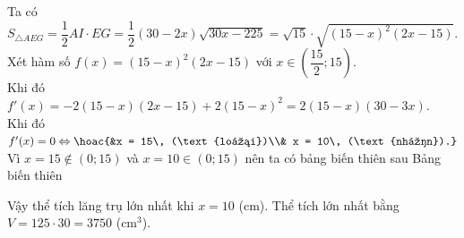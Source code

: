 \begin{ex}
{\begin{itemchoice}
			 \itemch
			Ta có $S_{\triangle AEG} = \dfrac{1}{2}AI \cdot EG = \dfrac{1}{2}(30 - 2x) \sqrt{30x - 225} = \sqrt{15} \cdot \sqrt{(15  - x)^2 (2x - 15)}.$
			\itemch 
			Xét hàm số $f(x) = (15 - x)^2(2x - 15)$  với $x \in \left(\dfrac{15}{2}; 15\right)$.\\
			Khi đó $f'(x) = -2(15 - x)(2x - 15) +  2(15 - x)^2 = 2(15 - x)(30 - 3x)$.\\
			Khi  đó $f'(x) = 0 \Leftrightarrow \hoac{&x = 15\, (\text{loại})\\& x = 10\, (\text{nhận}).}$\\
			Vì $x = 15 \notin \left(0;  15\right)$ và $x = 10 \in \left(0; 15\right)$ nên ta có bảng biến thiên sau
			Bảng  biến thiên
			\begin{center}
			\end{center}
			Vậy thể  tích lăng trụ lớn nhất khi $x = 10$ (cm).
			\itemch Thể tích lớn nhất bằng $V = 125  \cdot 30 = 3750$ (cm$^3$).
		\end{itemchoice}
	} 
\end{ex}


